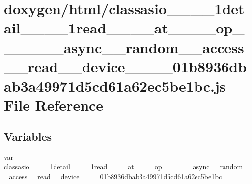\hypertarget{classasio____1____1detail____1____1read________at________op____3____01____async____random____accdd1f6f7a6cf88d94e72c2a28d5437ce1}{}\section{doxygen/html/classasio\+\_\+\+\_\+\_\+\+\_\+1detail\+\_\+\+\_\+\_\+\+\_\+1read\+\_\+\+\_\+\+\_\+\+\_\+at\+\_\+\+\_\+\+\_\+\+\_\+op\+\_\+\+\_\+\_\+\+\_\+\_\+\+\_\+async\+\_\+\+\_\+random\+\_\+\+\_\+access\+\_\+\+\_\+read\+\_\+\+\_\+device\+\_\+\+\_\+\_\+\+\_\+01b8936dbab3a49971d5cd61a62ec5be1bc.js File Reference}
\label{classasio____1____1detail____1____1read________at________op____3____01____async____random____accdd1f6f7a6cf88d94e72c2a28d5437ce1}
\subsection*{Variables}
\begin{DoxyCompactItemize}
\item 
var \hyperlink{classasio____1____1detail____1____1read________at________op____3____01____async____random____accdd1f6f7a6cf88d94e72c2a28d5437ce1_a1e82f5b03127f1967e3efe5683b05b37}{classasio\+\_\+\+\_\+\_\+\+\_\+1detail\+\_\+\+\_\+\_\+\+\_\+1read\+\_\+\+\_\+\+\_\+\+\_\+at\+\_\+\+\_\+\+\_\+\+\_\+op\+\_\+\+\_\+\_\+\+\_\+\_\+\+\_\+async\+\_\+\+\_\+random\+\_\+\+\_\+access\+\_\+\+\_\+read\+\_\+\+\_\+device\+\_\+\+\_\+\_\+\+\_\+01b8936dbab3a49971d5cd61a62ec5be1bc}
\end{DoxyCompactItemize}


